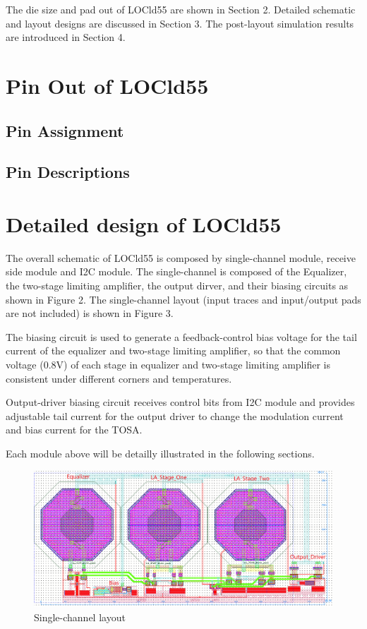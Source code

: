 \documentclass[11pt,a4paper]{article}
\begin{document}
\begin{spacing}{1.25}
The die size and pad out of LOCld55 are shown in Section 2. Detailed schematic and layout designs are discussed in Section 3. The post-layout simulation results are introduced in Section 4.

\section{Pin Out of LOCld55}                %

\subsection{Pin Assignment}

\subsection{Pin Descriptions}

\section{Detailed design of LOCld55}        %
The overall schematic of LOCld55 is composed by single-channel module, receive side module and I2C module. The single-channel is composed of the Equalizer, the two-stage limiting amplifier, the output dirver, and their biasing circuits as shown in Figure 2. The single-channel layout (input traces and input/output pads are not included) is shown in Figure 3.

The biasing circuit is used to generate a feedback-control bias voltage for the tail current of the equalizer and two-stage limiting amplifier, so that the common voltage (0.8V) of each stage in equalizer and two-stage limiting amplifier is consistent under different corners and temperatures.

Output-driver biasing circuit receives control bits from I2C module and provides adjustable tail current for the output driver to change the modulation current and bias current for the TOSA.

Each module above will be detailly illustrated in the following sections.
\begin{figure}[H]
    \includegraphics[width=\linewidth]{./Img/Layout_Eq_LA_OD_Background.png}
    \caption{Single-channel layout}
\end{figure}


\end{spacing}
\end{document}
